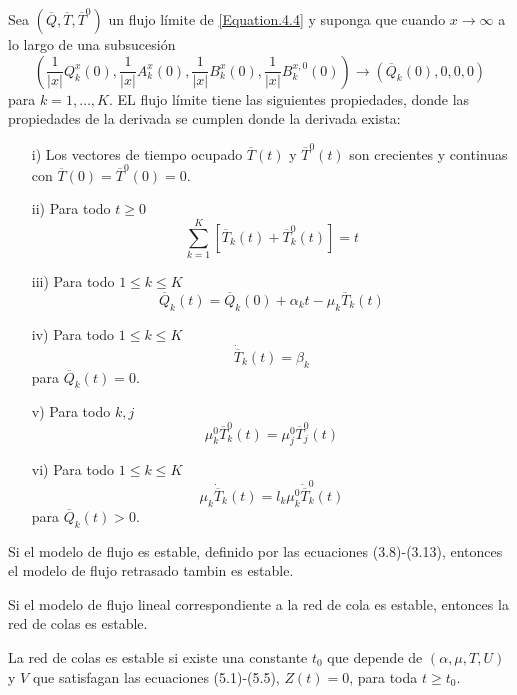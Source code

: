 \begin{Prop}
 Sea $\left(\overline{Q},\overline{T},\overline{T}^{0}\right)$ un flujo l\'imite de \ref{Equation.4.4} y suponga que cuando $x\rightarrow\infty$ a lo largo de
una subsucesi\'on
\[\left(\frac{1}{|x|}Q_{k}^{x}\left(0\right),\frac{1}{|x|}A_{k}^{x}\left(0\right),\frac{1}{|x|}B_{k}^{x}\left(0\right),\frac{1}{|x|}B_{k}^{x,0}\left(0\right)\right)\rightarrow\left(\overline{Q}_{k}\left(0\right),0,0,0\right)\]
para $k=1,\ldots,K$. EL flujo l\'imite tiene las siguientes
propiedades, donde las propiedades de la derivada se cumplen donde
la derivada exista:
\begin{itemize}
 \item[i)] Los vectores de tiempo ocupado $\overline{T}\left(t\right)$ y $\overline{T}^{0}\left(t\right)$ son crecientes y continuas con
$\overline{T}\left(0\right)=\overline{T}^{0}\left(0\right)=0$.
\item[ii)] Para todo $t\geq0$
\[\sum_{k=1}^{K}\left[\overline{T}_{k}\left(t\right)+\overline{T}_{k}^{0}\left(t\right)\right]=t\]
\item[iii)] Para todo $1\leq k\leq K$
\[\overline{Q}_{k}\left(t\right)=\overline{Q}_{k}\left(0\right)+\alpha_{k}t-\mu_{k}\overline{T}_{k}\left(t\right)\]
\item[iv)]  Para todo $1\leq k\leq K$
\[\dot{{\overline{T}}}_{k}\left(t\right)=\beta_{k}\] para $\overline{Q}_{k}\left(t\right)=0$.
\item[v)] Para todo $k,j$
\[\mu_{k}^{0}\overline{T}_{k}^{0}\left(t\right)=\mu_{j}^{0}\overline{T}_{j}^{0}\left(t\right)\]
\item[vi)]  Para todo $1\leq k\leq K$
\[\mu_{k}\dot{{\overline{T}}}_{k}\left(t\right)=l_{k}\mu_{k}^{0}\dot{{\overline{T}}}_{k}^{0}\left(t\right)\] para $\overline{Q}_{k}\left(t\right)>0$.
\end{itemize}
\end{Prop}

\begin{Lema}\label{Lema3.1}
Si el modelo de flujo es estable, definido por las ecuaciones
(3.8)-(3.13), entonces el modelo de flujo retrasado tambin es
estable.
\end{Lema}

\begin{Teo}\label{Tma.5.2}
Si el modelo de flujo lineal correspondiente a la red de cola es
estable, entonces la red de colas es estable.
\end{Teo}

\begin{Teo}\label{Tma.5.1.Chen}
La red de colas es estable si existe una constante $t_{0}$ que
depende de $\left(\alpha,\mu,T,U\right)$ y $V$ que satisfagan las
ecuaciones (5.1)-(5.5), $Z\left(t\right)=0$, para toda $t\geq
t_{0}$.
\end{Teo}



